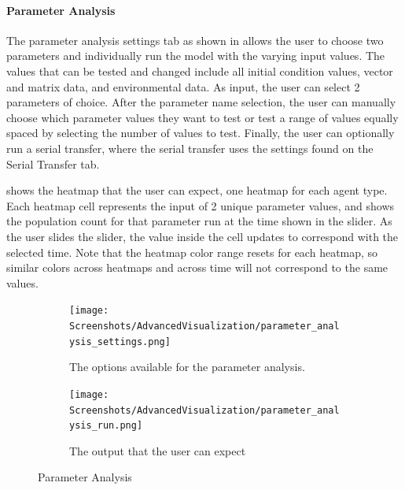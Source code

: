 \paragraph{Parameter Analysis}
\label{sec:parameter_analysis}
The parameter analysis settings tab as shown in  allows the user to choose two parameters and individually run the model with the varying input values.
The values that can be tested and changed include all initial condition values, vector and matrix data, and environmental data.
As input, the user can select 2 parameters of choice.
After the parameter name selection, the user can manually choose which parameter values they want to test or test a range of values equally spaced by selecting the number of values to test.
Finally, the user can optionally run a serial transfer, where the serial transfer uses the settings found on the Serial Transfer tab. 

 shows the heatmap that the user can expect, one heatmap for each agent type.
Each heatmap cell represents the input of 2 unique parameter values, and shows the population count for that parameter run at the time shown in the slider. 
As the user slides the slider, the value inside the cell updates to correspond with the selected time. 
Note that the heatmap color range resets for each heatmap, so similar colors across heatmaps and across time will not correspond to the same values.

\begin{figure}[!ht]
    \centering
    \begin{subfigure}{0.49\linewidth}
        \centering
        \vspace*{\fill}
        \texttt{[image: Screenshots/AdvancedVisualization/parameter\_analysis\_settings.png]}
        \caption{
            The options available for the parameter analysis. 
        }
        \label{fig:ss:av:parameter_analysis_settings}
        \vspace*{\fill}
    \end{subfigure}
    \hfill
    \begin{subfigure}{0.49\linewidth}
        \centering
        \vspace*{\fill}
        \texttt{[image: Screenshots/AdvancedVisualization/parameter\_analysis\_run.png]}
        \caption{
            The output that the user can expect
        }
        \label{fig:ss:av:parameter_analysis_run}
        \vspace*{\fill}
    \end{subfigure}
    \caption{Parameter Analysis}
\end{figure}


